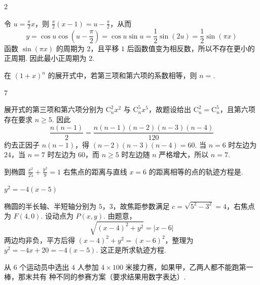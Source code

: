 \documentclass[UTF8,a4paper,oneside,11pt]{ctexbook}
\begin{document}
\begin{answer}
\(2\)
\end{answer}

\begin{solution}
令 \(u=\frac\pi2x\)，则 \(\frac\pi2(x-1)=u-\frac\pi2\)，从而
\[
y=\cos u\cos\left(u-\frac\pi2\right)=\cos u\sin u=\frac12\sin(2u)=\frac12\sin(\pi x)
\]
函数 \(\sin(\pi x)\) 的周期为 \(2\)，且平移 \(1\) 后函数值变为相反数，所以不存在更小的正周期. 因此最小正周期为 \(2\).
\end{solution}

\begin{problem}
在 \((1+x)^n\) 的展开式中，若第三项和第六项的系数相等，则 \(n=\)\fillinblank{}.
\end{problem}

\begin{answer}
\(7\)
\end{answer}

\begin{solution}
展开式的第三项和第六项分别为 \(\mathrm C_n^2x^2\) 与 \(\mathrm C_n^5x^5\)，故题设给出 \(\mathrm C_n^2=\mathrm C_n^5\)，且第六项存在要求 \(n\geqslant5\). 因此
\[
\frac{n(n-1)}2=\frac{n(n-1)(n-2)(n-3)(n-4)}{120}
\]
约去正因子 \(n(n-1)\)，得 \((n-2)(n-3)(n-4)=60\). 当 \(n=6\) 时左边为 \(24\)，当 \(n=7\) 时左边为 \(60\)，而 \(n\geqslant5\) 时左边随 \(n\) 严格增大，所以 \(n=7\).
\end{solution}

\begin{problem}
到椭圆 \(\frac{x^2}{25}+\frac{y^2}{9}=1\) 右焦点的距离与直线 \(x=6\) 的距离相等的点的轨迹方程是\fillinblank{}.
\end{problem}

\begin{answer}
\(y^2=-4(x-5)\)
\end{answer}

\begin{solution}
椭圆的半长轴、半短轴分别为 \(5\)，\(3\)，故焦距参数满足 \(c=\sqrt{5^2-3^2}=4\)，右焦点为 \(F(4,0)\). 设动点为 \(P(x,y)\). 由题意，
\[
\sqrt{(x-4)^2+y^2}=|x-6|
\]
两边均非负，平方后得 \((x-4)^2+y^2=(x-6)^2\)，整理为 \(y^2=-4x+20=-4(x-5)\). 这正是所求轨迹方程.
\end{solution}

\begin{problem}
从 \(6\) 个运动员中选出 \(4\) 人参加 \(4\times100\text{ 米}\)接力赛，如果甲，乙两人都不能跑第一棒，那末共有\fillinblank{} 种不同的参赛方案（要求结果用数字表达）.
\end{problem}
\end{document}
